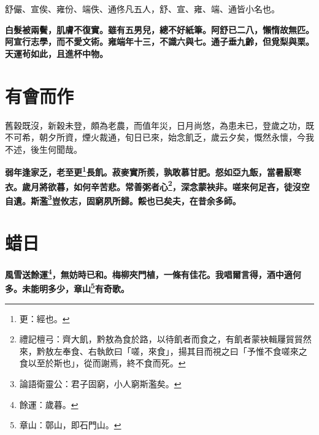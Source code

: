 \begin{quoting}舒儼、宣俟、雍份、端佚、通佟凡五人，舒、宣、雍、端、通皆小名也。\end{quoting}

\textbf{白髮被兩鬢，肌膚不復實。雖有五男兒，總不好紙筆。阿舒已二八，懶惰故無匹。阿宣行志學，而不愛文術。雍端年十三，不識六與七。通子垂九齡，但覓梨與栗。天運茍如此，且進杯中物。}

\section{有會而作\hspace{1ex}{\footnotesize 并序}}

\begin{quoting}舊穀既沒，新穀未登，頗為老農，而值年災，日月尚悠，為患未已，登歲之功，既不可希，朝夕所資，煙火裁通，旬日已來，始念飢乏，歲云夕矣，慨然永懷，今我不述，後生何聞哉。\end{quoting}

\textbf{弱年逢家乏，老至更\footnote{更：經也。}長飢。菽麥實所羨，孰敢慕甘肥。惄如亞九飯，當暑厭寒衣。歲月將欲暮，如何辛苦悲。常善粥者心\footnote{禮記檀弓：齊大飢，黔敖為食於路，以待飢者而食之，有飢者蒙袂輯屨貿貿然來，黔敖左奉食、右執飲曰「嗟，來食」，揚其目而視之曰「予惟不食嗟來之食以至於斯也」，從而謝焉，終不食而死。}，深念蒙袂非。嗟來何足吝，徒沒空自遺。斯濫\footnote{論語衛靈公：君子固窮，小人窮斯濫矣。}豈攸志，固窮夙所歸。餒也已矣夫，在昔余多師。}

\section{蜡日}

\textbf{風雪送餘運\footnote{餘運：歲暮。}，無妨時已和。梅柳夾門植，一條有佳花。我唱爾言得，酒中適何多。未能明多少，章山\footnote{章山：鄣山，即石門山。}有奇歌。}

